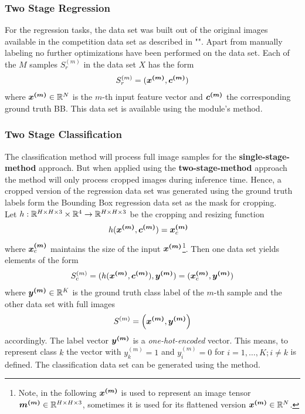 \subsubsection{Two Stage Regression}
For the regression tasks, the data set was built out of the original images available in the  competition data set as described in "".
Apart from manually labeling no further optimizations have been performed on the data set.
Each of the $M$ samples $S_r^{(m)}$ in the data set $X$ has the form
\begin{align}
    S^{(m)}_r = (\bm{x^{(m)}}, \bm{c^{(m)}})
    \label{eq:regression-sample}
\end{align}
where $\bm{x^{(m)}}\in \mathbb{R}^N$ is the $m$-th input feature vector and $\bm{c^{(m)}}$ the corresponding ground truth BB.
This data set is available using the module's  method.
\subsubsection{Two Stage Classification}
The classification method will process full image samples for the \textbf{single-stage-method} approach.
But when applied using the \textbf{two-stage-method} approach the method will only process cropped images during inference time.
Hence, a cropped version of the regression data set was generated using the ground truth labels form the Bounding Box regression data set as the mask for cropping.\\
Let $h: \mathbb{R}^{H\times H\times 3} \times \mathbb{R}^{4} \rightarrow \mathbb{R}^{H\times H\times 3}$ be the cropping and resizing function
\begin{align}
    h(\bm{x^{(m)}}, \bm{c^{(m)}}) = \bm{x^{(m)}}_c\quad
    \label{eq:crop}
\end{align}
where $\bm{x^{(m)}}_c$ maintains the size of the input $\bm{x^{(m)}}$\footnote{
    Note, in the following $\bm{x^{(m)}}$ is used to represent an image tensor $\bm{m^{(m)}}\in\mathbb{R}^{H\times H\times 3}$, sometimes it is used for its flattened version $\bm{x^{(m)}}\in\mathbb{R}^{N}$.
}.
Then one data set yields elements of the form
\begin{align}
    S^{(m)}_c = (h(\bm{x^{(m)}}, \bm{c^{(m)}}), \bm{y^{(m)}}) = (\bm{x^{(m)}}_c, \bm{y^{(m)}})
    \label{eq:cropped-sample}
\end{align}
where $\bm{y^{(m)}}\in \mathbb{R}^K$ is the ground truth class label of the $m$-th sample and the other data set with full images
\begin{align}
    S^{(m)} = \left(\bm{x^{(m)}}, \bm{y^{(m)}}\right)
    \label{eq:classification-sample}
\end{align}
accordingly.
The label vector $\bm{y^{(m)}}$ is a \textit{one-hot-encoded} vector.
This means, to represent class $k$ the vector with $y^{(m)}_k = 1$ and $y^{(m)}_i = 0$ for $i=1,\ldots,K; i\neq k$ is defined.
The classification data set can be generated using the  method.

